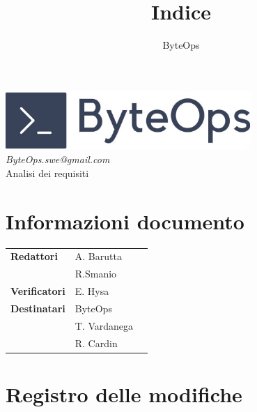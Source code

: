 \documentclass{article}
\title{\textbf{\fontsize{28}{6}\selectfont Indice}}
\author{\fontsize{14}{6}\selectfont ByteOps}
\date{}
\begin{document}

\pagestyle{fancy}
\begin{center}
    \includegraphics[width = 0.7\textwidth]{../Images/logo.png} \\
    \vspace{0.2cm}
    \textcolor[RGB]{60, 60, 60}{\textit{ByteOps.swe@gmail.com}} \\
    \vspace{1cm}
    \fontsize{16}{6}\selectfont Analisi dei requisiti\\
    \vspace{0.5cm}
\end{center}

\section*{Informazioni documento}
\def\arraystretch{1.2}
\begin{tabular}{>{\raggedleft\arraybackslash}p{}|>{\raggedright\arraybackslash}p{}c}
    \hline
    \addlinespace
    \textbf{Redattori}    & A. Barutta\\ & R.Smanio \vspace{10pt} \\
    \textbf{Verificatori} & E. Hysa \vspace{10pt} \\
    \textbf{Destinatari}  & ByteOps\\ & T. Vardanega   \\ & R. Cardin \vspace{10pt} \\
\end{tabular}
\pagebreak


\section*{Registro delle modifiche}
\end{document}
